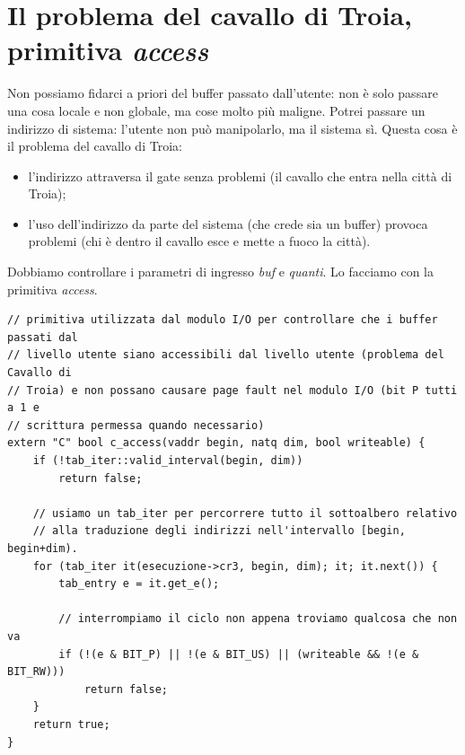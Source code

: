 \documentclass[11pt]{report}
\theoremstyle{definition}
\begin{document}
\section{Il problema del cavallo di Troia, primitiva \emph{access}}
	Non possiamo fidarci a priori del buffer passato dall'utente: non è solo passare una cosa locale e non globale, ma cose molto più maligne. Potrei passare un indirizzo di sistema: l'utente non può manipolarlo, ma il sistema sì. Questa cosa è il {problema del cavallo di Troia}:
	\begin{itemize}
		\item l'indirizzo attraversa il gate senza problemi (il cavallo che entra nella città di Troia);
		\item l'uso dell'indirizzo da parte del sistema (che crede sia un buffer) provoca problemi (chi è dentro il cavallo esce e mette a fuoco la città).
	\end{itemize}
	Dobbiamo controllare i parametri di ingresso \emph{buf} e \emph{quanti}. Lo facciamo con la primitiva \emph{access}.
\small 
\begin{verbatim}
// primitiva utilizzata dal modulo I/O per controllare che i buffer passati dal
// livello utente siano accessibili dal livello utente (problema del Cavallo di
// Troia) e non possano causare page fault nel modulo I/O (bit P tutti a 1 e
// scrittura permessa quando necessario)
extern "C" bool c_access(vaddr begin, natq dim, bool writeable) {
    if (!tab_iter::valid_interval(begin, dim))
        return false;
	
    // usiamo un tab_iter per percorrere tutto il sottoalbero relativo
    // alla traduzione degli indirizzi nell'intervallo [begin, begin+dim).
    for (tab_iter it(esecuzione->cr3, begin, dim); it; it.next()) {
        tab_entry e = it.get_e();
		
        // interrompiamo il ciclo non appena troviamo qualcosa che non va
        if (!(e & BIT_P) || !(e & BIT_US) || (writeable && !(e & BIT_RW)))
            return false;
    }
    return true;
}
\end{verbatim}
\normalsize 
	
\end{document}
